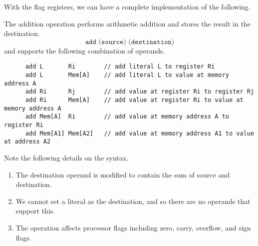   With the flag registers, we can have a complete implementation of the following. 

  \begin{definition}[Addition]
    The addition operation performs arithmetic addition and stores the result in the destination.
    \begin{equation}
      \texttt{add (source) (destination)}
    \end{equation}
    and supports the following combination of operands.
    \begin{lstlisting}
      add L       Ri        // add literal L to register Ri
      add L       Mem[A]    // add literal L to value at memory address A
      add Ri      Rj        // add value at register Ri to register Rj
      add Ri      Mem[A]    // add value at register Ri to value at memory address A
      add Mem[A]  Ri        // add value at memory address A to register Ri
      add Mem[A1] Mem[A2]   // add value at memory address A1 to value at address A2
    \end{lstlisting}
    Note the following details on the syntax.
    \begin{enumerate}
      \item The destination operand is modified to contain the sum of source and destination.
      \item We cannot set a literal as the destination, and so there are no operands that support this.
      \item The operation affects processor flags including zero, carry, overflow, and sign flags.
    \end{enumerate}
  \end{definition}

  \begin{definition}
    
  \end{definition}

